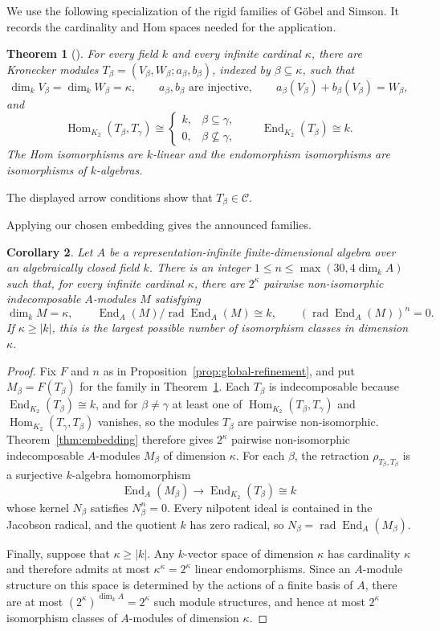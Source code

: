 \documentclass[a4paper,reqno,10pt]{amsart}
\newtheorem{theorem}{Theorem}[section]
\newtheorem{corollary}[theorem]{Corollary}
\theoremstyle{definition}
\DeclareMathOperator{\Hom}{Hom}
\DeclareMathOperator{\End}{End}
\DeclareMathOperator{\rad}{rad}
\newcommand{\dm}{\dim_k}
\newcommand{\C}{\mathcal C}
\numberwithin{equation}{section}
\begin{document}
We use the following specialization of the rigid families of
G\"obel and Simson. It records the cardinality and Hom spaces needed
for the application.
\begin{theorem}[{\cite[Theorem~1.2(i),(iii) and Theorem~3.3]{GoebelSimson}}]
\label{thm:rigid-family}
For every field $k$ and every infinite cardinal $\kappa$, there are
Kronecker modules $T_\beta=(V_\beta,W_\beta;a_\beta,b_\beta)$,
indexed by $\beta\subseteq\kappa$, such that
\[
 \dm V_\beta=\dm W_\beta=\kappa,
 \qquad a_\beta,b_\beta\text{ are injective},\qquad
 a_\beta(V_\beta)+b_\beta(V_\beta)=W_\beta,
\]
and
\[
 \Hom_{K_2}(T_\beta,T_\gamma)\cong
 \begin{cases}k,&\beta\subseteq\gamma,\\0,&\beta\nsubseteq\gamma,\end{cases}
 \qquad \End_{K_2}(T_\beta)\cong k.
\]
The Hom isomorphisms are $k$-linear and the endomorphism isomorphisms
are isomorphisms of $k$-algebras.
\end{theorem}
The displayed arrow conditions show that $T_\beta\in\C$.

Applying our chosen embedding gives the announced families.
\begin{corollary}\label{cor:radical}
Let $A$ be a representation-infinite finite-dimensional algebra over an
algebraically closed field $k$. There is an integer
$1\le n\le\max(30,4\dm A)$ such that, for every infinite cardinal
$\kappa$, there are $2^\kappa$ pairwise non-isomorphic indecomposable
$A$-modules $M$ satisfying
\[
 \dm M=\kappa,\qquad
 \End_A(M)/\rad\End_A(M)\cong k,\qquad
 (\rad\End_A(M))^n=0.
\]
If $\kappa\ge |k|$, this is the largest possible number of isomorphism
classes in dimension $\kappa$.
\end{corollary}
\begin{proof}
Fix $F$ and $n$ as in Proposition~\ref{prop:global-refinement}, and
put $M_\beta=F(T_\beta)$ for the family in
Theorem~\ref{thm:rigid-family}. Each $T_\beta$ is indecomposable
because $\End_{K_2}(T_\beta)\cong k$, and for $\beta\ne\gamma$ at
least one of $\Hom_{K_2}(T_\beta,T_\gamma)$ and $\Hom_{K_2}(T_\gamma,T_\beta)$ vanishes,
so the modules $T_\beta$ are pairwise non-isomorphic. Theorem~\ref{thm:embedding} therefore
gives $2^\kappa$ pairwise non-isomorphic indecomposable $A$-modules $M_\beta$ of
dimension $\kappa$.
For each $\beta$, the retraction $\rho_{T_\beta,T_\beta}$ is a surjective $k$-algebra homomorphism
\[
 \End_A(M_\beta)\longrightarrow\End_{K_2}(T_\beta)\cong k
\]
whose kernel $N_\beta$ satisfies $N_\beta^n=0$.
Every nilpotent ideal is contained in the Jacobson radical, and the quotient $k$
has zero radical, so
$N_\beta=\rad\End_A(M_\beta)$.

Finally, suppose that $\kappa\ge|k|$. Any $k$-vector space of dimension $\kappa$
has cardinality $\kappa$ and therefore admits at most
$\kappa^\kappa=2^\kappa$ linear endomorphisms. Since an $A$-module structure
on this space is determined by the actions of a finite basis of $A$, there are
at most $(2^\kappa)^{\dm A}=2^\kappa$ such module structures, and hence at most $2^\kappa$
isomorphism classes of $A$-modules of dimension $\kappa$.
\end{proof}
\end{document}

